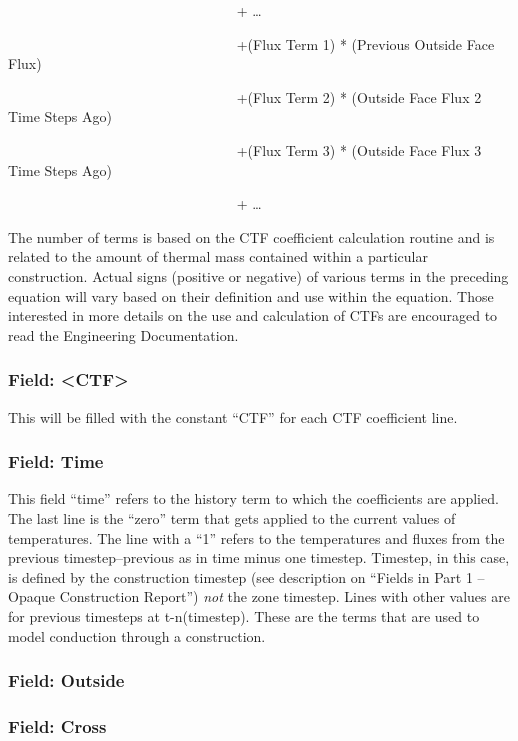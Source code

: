 ~~~~~~~~~~~~~~~~~~~~~~~~~~~~~~~~ + \ldots{}

~~~~~~~~~~~~~~~~~~~~~~~~~~~~~~~~ +(Flux Term 1) * (Previous Outside Face Flux)

~~~~~~~~~~~~~~~~~~~~~~~~~~~~~~~~ +(Flux Term 2) * (Outside Face Flux 2 Time Steps Ago)

~~~~~~~~~~~~~~~~~~~~~~~~~~~~~~~~ +(Flux Term 3) * (Outside Face Flux 3 Time Steps Ago)

~~~~~~~~~~~~~~~~~~~~~~~~~~~~~~~~ + \ldots{}

The number of terms is based on the CTF coefficient calculation routine and is related to the amount of thermal mass contained within a particular construction. Actual signs (positive or negative) of various terms in the preceding equation will vary based on their definition and use within the equation. Those interested in more details on the use and calculation of CTFs are encouraged to read the Engineering Documentation.

\subsubsection{Field: \textless{}CTF\textgreater{}}\label{field-ctf}

This will be filled with the constant ``CTF'' for each CTF coefficient line.

\subsubsection{Field: Time}\label{field-time}

This field ``time'' refers to the history term to which the coefficients are applied. The last line is the ``zero'' term that gets applied to the current values of temperatures. The line with a ``1'' refers to the temperatures and fluxes from the previous timestep--previous as in time minus one timestep. Timestep, in this case, is defined by the construction timestep (see description on ``Fields in Part 1 -- Opaque Construction Report'') \emph{not} the zone timestep. Lines with other values are for previous timesteps at t-n(timestep). These are the terms that are used to model conduction through a construction.

\subsubsection{Field: Outside}\label{field-outside}

\subsubsection{Field: Cross}\label{field-cross}

